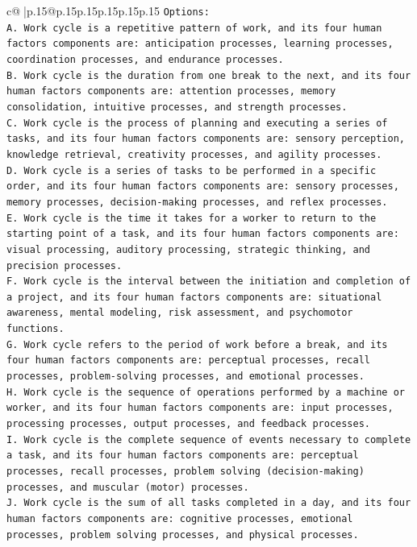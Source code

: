 \documentclass{article}
\begin{document}
{\begin{supertabular}{c@{$\;$}|p{.15\linewidth}@{}p{.15\linewidth}p{.15\linewidth}p{.15\linewidth}p{.15\linewidth}p{.15\linewidth}}
{{{\texttt{Options:} \\
\texttt{A. Work cycle is a repetitive pattern of work, and its four human factors components are: anticipation processes, learning processes, coordination processes, and endurance processes.} \\
\texttt{B. Work cycle is the duration from one break to the next, and its four human factors components are: attention processes, memory consolidation, intuitive processes, and strength processes.} \\
\texttt{C. Work cycle is the process of planning and executing a series of tasks, and its four human factors components are: sensory perception, knowledge retrieval, creativity processes, and agility processes.} \\
\texttt{D. Work cycle is a series of tasks to be performed in a specific order, and its four human factors components are: sensory processes, memory processes, decision{-}making processes, and reflex processes.} \\
\texttt{E. Work cycle is the time it takes for a worker to return to the starting point of a task, and its four human factors components are: visual processing, auditory processing, strategic thinking, and precision processes.} \\
\texttt{F. Work cycle is the interval between the initiation and completion of a project, and its four human factors components are: situational awareness, mental modeling, risk assessment, and psychomotor functions.} \\
\texttt{G. Work cycle refers to the period of work before a break, and its four human factors components are: perceptual processes, recall processes, problem{-}solving processes, and emotional processes.} \\
\texttt{H. Work cycle is the sequence of operations performed by a machine or worker, and its four human factors components are: input processes, processing processes, output processes, and feedback processes.} \\
\texttt{I. Work cycle is the complete sequence of events necessary to complete a task, and its four human factors components are: perceptual processes, recall processes, problem solving (decision{-}making) processes, and muscular (motor) processes.} \\
\texttt{J. Work cycle is the sum of all tasks completed in a day, and its four human factors components are: cognitive processes, emotional processes, problem solving processes, and physical processes.} \\
            }
        }
    }
     \\ \\


\end{supertabular}}
\end{document}
